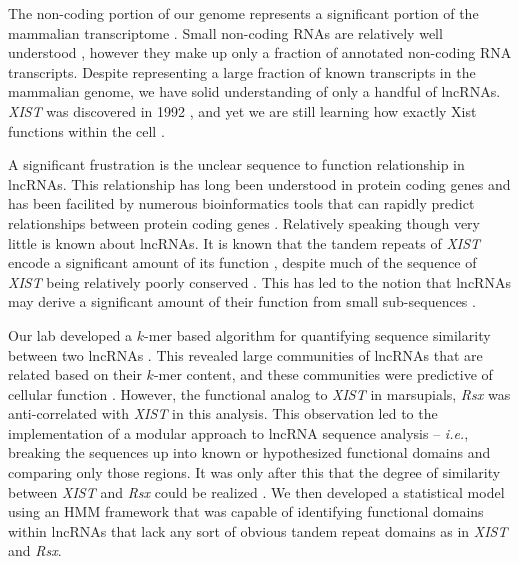 The non-coding portion of our genome represents a significant portion of the mammalian transcriptome \cite{Rinn2012GenomeRNAs}. Small non-coding RNAs are relatively well understood \cite{Rinn2012GenomeRNAs}, however they make up only a fraction of annotated non-coding RNA transcripts. Despite representing a large fraction of known transcripts in the mammalian genome, we have solid understanding of only a handful of lncRNAs. \emph{XIST} was discovered in 1992 \cite{Brown10TheNucleus.}, and yet we are still learning how exactly Xist functions within the cell \cite{Schertzer2019LncRNA-InducedDNA,DaRocha2017NovelConformation}. 

A significant frustration is the unclear sequence to function relationship in lncRNAs. This relationship has long been understood in protein coding genes \cite{Whisstock2003PredictionStructure} and has been facilited by numerous bioinformatics tools that can rapidly predict relationships between protein coding genes \cite{Altschul1990BasicTool,Smith1981IdentificationSubsequences,Wheeler2013Nhmmer:HMMs,Yi2013Co-phylog:Organisms,Qi2004WholeApproach}. Relatively speaking though very little is known about lncRNAs. It is known that the tandem repeats of \emph{XIST} encode a significant amount of its function \cite{Nesterova2001CharacterizationSequence,Wang2017TargetingGuanines,Hoki2009AMouse,Zhao2008PolycombChromosome,Pintacuda2017HnRNPKSilencing}, despite much of the sequence of \emph{XIST} being relatively poorly conserved \cite{Nesterova2001CharacterizationSequence}. This has led to the notion that lncRNAs may derive a significant amount of their function from small sub-sequences \cite{Brockdorff2018LocalNcRNA, Sprague2019NonlinearDomains}. 

Our lab developed a $k$-mer based algorithm for quantifying sequence similarity between two lncRNAs \cite{Kirk2018FunctionalContent}. This revealed large communities of lncRNAs that are related based on their $k$-mer content, and these communities were predictive of cellular function \cite{Kirk2018FunctionalContent}. However, the functional analog to \emph{XIST} in marsupials, \emph{Rsx} was anti-correlated with \emph{XIST} in this analysis. This observation led to the implementation of a modular approach to lncRNA sequence analysis -- \emph{i.e.}, breaking the sequences up into known or hypothesized functional domains and comparing only those regions. It was only after this that the degree of similarity between \emph{XIST} and \emph{Rsx} could be realized \cite{Sprague2019NonlinearDomains}. We then developed a statistical model using an HMM framework that was capable of identifying functional domains within lncRNAs that lack any sort of obvious tandem repeat domains as in \emph{XIST} and \emph{Rsx}. 

